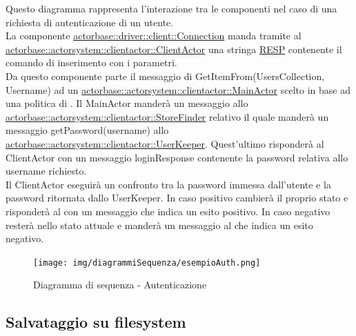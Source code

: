 \documentclass{scalatekids-article}
\begin{document}
Questo diagramma rappresenta l'interazione tra le componenti nel caso di una richiesta di autenticazione di un utente.\\
La componente \hyperref[sec:actorbase::driver::client::Connection]{actorbase::driver::client::Connection}
manda tramite  al \hyperref[sec:actorbase::actorsystem::clientactor::ClientActor]{actorbase::actorsystem::clientactor::ClientActor}
una stringa \hyperref[sec:RESP]{RESP} contenente il comando di inserimento  con
i parametri.\\
Da questo componente parte il messaggio di GetItemFrom(UsersCollection, Username) ad un \hyperref[sec:actorbase::actorsystem::clientactor::MainActor]{actorbase::actorsystem::clientactor::MainActor} scelto in base ad una
politica di . Il MainActor manderà un messaggio allo \hyperref[sec:actorbase::actorsystem::clientactor::StoreFinder]{actorbase::actorsystem::clientactor::StoreFinder} relativo il quale manderà un messaggio getPassword(username) allo \hyperref[sec:actorbase::actorsystem::clientactor::UserKeeper]{actorbase::actorsystem::clientactor::UserKeeper}. Quest'ultimo risponderà al ClientActor con un messaggio loginResponse contenente la password relativa allo username richiesto.\\
Il ClientActor eseguirà un confronto tra la password immessa dall'utente e la password ritornata dallo UserKeeper. In caso positivo cambierà il proprio stato
e risponderà al  con un messaggio che indica un esito positivo. In caso negativo resterà nello stato attuale e manderà un messaggio al  che indica un esito negativo.
\begin{figure}[H]
  \begin{center}
    \texttt{[image: img/diagrammiSequenza/esempioAuth.png]}
    \caption{Diagramma di sequenza - Autenticazione}
  \end{center}
\end{figure}

\subsection{Salvataggio su filesystem}
\end{document}
